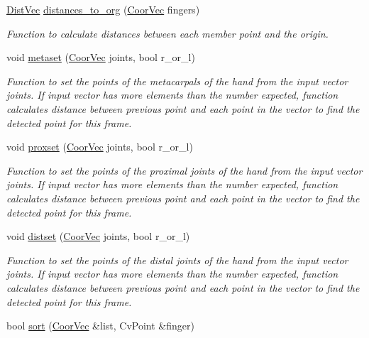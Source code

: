 \begin{DoxyCompactItemize}
\hyperlink{transform_8h_af617b6161d0af4668c255bbe3894b22d}{DistVec} \hyperlink{classFullhand_a227ed94640f8000c76fc4a343da02787}{distances\_\-to\_\-org} (\hyperlink{blobby_8h_a7017012a1393f7249d0e03d6ac9f1c7b}{CoorVec} fingers)
\begin{DoxyCompactList}\small\item\em Function to calculate distances between each member point and the origin. \end{DoxyCompactList}\item 
void \hyperlink{classFullhand_a6bf1d5c8dca245244cd0e74c8a70796b}{metaset} (\hyperlink{blobby_8h_a7017012a1393f7249d0e03d6ac9f1c7b}{CoorVec} joints, bool r\_\-or\_\-l)
\begin{DoxyCompactList}\small\item\em Function to set the points of the metacarpals of the hand from the input vector {\itshape joints\/}. If input vector has more elements than the number expected, function calculates distance between previous point and each point in the vector to find the detected point for this frame. \end{DoxyCompactList}\item 
void \hyperlink{classFullhand_a16c759028b0aa56ef1f77d52f86f09cb}{proxset} (\hyperlink{blobby_8h_a7017012a1393f7249d0e03d6ac9f1c7b}{CoorVec} joints, bool r\_\-or\_\-l)
\begin{DoxyCompactList}\small\item\em Function to set the points of the proximal joints of the hand from the input vector {\itshape joints\/}. If input vector has more elements than the number expected, function calculates distance between previous point and each point in the vector to find the detected point for this frame. \end{DoxyCompactList}\item 
void \hyperlink{classFullhand_accd5f73ff7c0603b42eaa9a2579a0540}{distset} (\hyperlink{blobby_8h_a7017012a1393f7249d0e03d6ac9f1c7b}{CoorVec} joints, bool r\_\-or\_\-l)
\begin{DoxyCompactList}\small\item\em Function to set the points of the distal joints of the hand from the input vector {\itshape joints\/}. If input vector has more elements than the number expected, function calculates distance between previous point and each point in the vector to find the detected point for this frame. \end{DoxyCompactList}\item 
bool \hyperlink{classFullhand_a92e663c06eb0d0787cb721db20d661a2}{sort} (\hyperlink{blobby_8h_a7017012a1393f7249d0e03d6ac9f1c7b}{CoorVec} \&list, CvPoint \&finger)

\end{DoxyCompactItemize}
